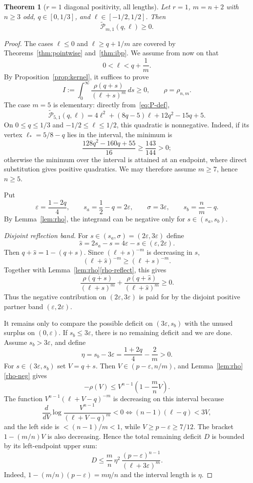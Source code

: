 \documentclass[11pt]{article}
\newtheorem{theorem}{Theorem}[section]
\newcommand{\wtP}{\widetilde{\mathcal P}}
\begin{document}
\begin{theorem}[$r=1$ diagonal positivity, all lengths]\label{thm:r1}
Let $r=1$, $m=n+2$ with $n\ge3$ odd, $q\in[0,1/3]$, and $\ell\in[-1/2,1/2]$.  Then
\[
        \wtP_{m,1}(q,\ell)\ge0.
\]
\end{theorem}

\begin{proof}
The cases $\ell\le0$ and $\ell\ge q+1/m$ are covered by Theorems~\ref{thm:pointwise} and~\ref{thm:ibp}.  We assume from now on that
\[
        0<\ell<q+\frac1m.
\]
By Proposition~\ref{prop:kernel}, it suffices to prove
\[
        I:=\int_0^\infty \frac{\rho(q+s)}{(\ell+s)^m}\,ds\ge0,
        \qquad \rho=\rho_{n,m}.
\]
The case $m=5$ is elementary: directly from~\eqref{eq:P-def},
\[
        \wtP_{5,1}(q,\ell)=4\ell^2+(8q-5)\ell+12q^2-15q+5.
\]
On $0\le q\le1/3$ and $-1/2\le\ell\le1/2$, this quadratic is nonnegative.  Indeed, if its vertex $\ell_*=5/8-q$ lies in the interval, the minimum is
\[
        \frac{128q^2-160q+55}{16}\ge \frac{143}{144}>0;
\]
otherwise the minimum over the interval is attained at an endpoint, where direct substitution gives positive quadratics.  We may therefore assume $m\ge7$, hence $n\ge5$.

Put
\[
        \varepsilon=\frac{1-2q}{4},
        \qquad s_a=\frac12-q=2\varepsilon,
        \qquad \sigma=3\varepsilon,
        \qquad s_b=\frac nm-q.
\]
By Lemma~\ref{lem:rho}, the integrand can be negative only for $s\in(s_a,s_b)$.

\emph{Disjoint reflection band.}  For $s\in(s_a,\sigma)=(2\varepsilon,3\varepsilon)$ define
\[
        \widehat s=2s_a-s=4\varepsilon-s\in(\varepsilon,2\varepsilon).
\]
Then $q+\widehat s=1-(q+s)$.  Since $(\ell+s)^{-m}$ is decreasing in $s$,
\[
        (\ell+\widehat s)^{-m}\ge(\ell+s)^{-m}.
\]
Together with Lemma~\ref{lem:rho}\ref{rho-reflect}, this gives
\[
        \frac{\rho(q+s)}{(\ell+s)^m}
        +\frac{\rho(q+\widehat s)}{(\ell+\widehat s)^m}
        \ge0.
\]
Thus the negative contribution on $(2\varepsilon,3\varepsilon)$ is paid for by the disjoint positive partner band $(\varepsilon,2\varepsilon)$.

It remains only to compare the possible deficit on $(3\varepsilon,s_b)$ with the unused surplus on $(0,\varepsilon)$.  If $s_b\le3\varepsilon$, there is no remaining deficit and we are done.  Assume $s_b>3\varepsilon$, and define
\[
        \eta=s_b-3\varepsilon=\frac{1+2q}{4}-\frac2m>0.
\]
For $s\in(3\varepsilon,s_b)$ set $V=q+s$.  Then $V\in(p-\varepsilon,n/m)$, and Lemma~\ref{lem:rho}\ref{rho-neg} gives
\[
        -\rho(V)\le V^{n-1}\left(1-\frac mnV\right).
\]
The function $V^{n-1}(\ell+V-q)^{-m}$ is decreasing on this interval because
\[
        \frac{d}{dV}\log\frac{V^{n-1}}{(\ell+V-q)^m}<0
        \iff (n-1)(\ell-q)<3V,
\]
and the left side is $<(n-1)/m<1$, while $V\ge p-\varepsilon\ge7/12$.  The bracket $1-(m/n)V$ is also decreasing.  Hence the total remaining deficit $D$ is bounded by its left-endpoint upper sum:
\begin{equation}\label{eq:D-new}
        D\le \frac mn\,\eta^2\,\frac{(p-\varepsilon)^{n-1}}{(\ell+3\varepsilon)^m}.
\end{equation}
Indeed, $1-(m/n)(p-\varepsilon)=m\eta/n$ and the interval length is $\eta$.


\end{proof}
\end{document}
